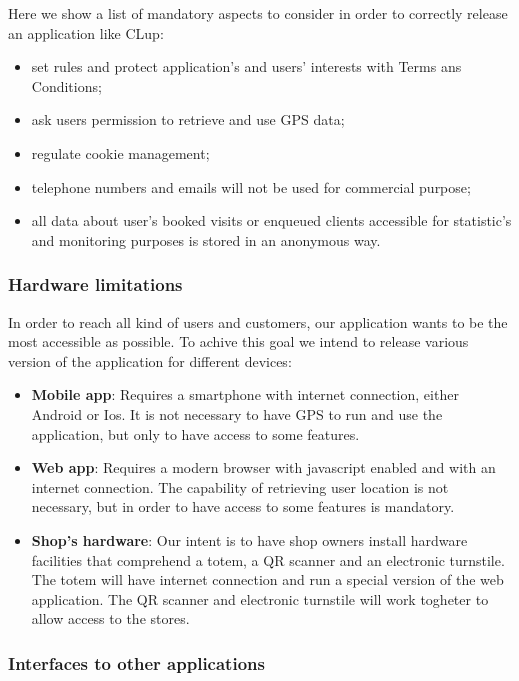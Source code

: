 Here we show a list of mandatory aspects to consider in order to correctly release an application like CLup:
\begin{itemize}
    \item set rules and protect application's and users' interests with Terms ans Conditions;
    \item ask users permission to retrieve and use GPS data;
    \item regulate cookie management;
    \item telephone numbers and emails will not be used for commercial purpose;
    \item all data about user's booked visits or enqueued clients accessible for statistic's and monitoring purposes is stored in an anonymous way.
\end{itemize}

\subsubsection{Hardware limitations}
\label{subsubsect:hardwarelimitations}

In order to reach all kind of users and customers, our application wants to be the most accessible as possible. To achive this goal we intend to release various version of the application for different devices:

\begin{itemize}
    \item \textbf{Mobile app}: Requires a smartphone with internet connection, either Android or Ios. It is not necessary to have GPS to run and use the application, but only to have access to some features.
    \item \textbf{Web app}: Requires a modern browser with javascript enabled and with an internet connection. The capability of retrieving user location is not necessary, but in order to have access to some features is mandatory.
    \item \textbf{Shop's hardware}: Our intent is to have shop owners install hardware facilities that comprehend a totem, a QR scanner and an electronic turnstile. The totem will have internet connection and run a special version of the web application. The QR scanner and electronic turnstile will work togheter to allow access to the stores. 
\end{itemize}

\subsubsection{Interfaces to other applications}
\label{subsubsect:interfacestootherappications}


